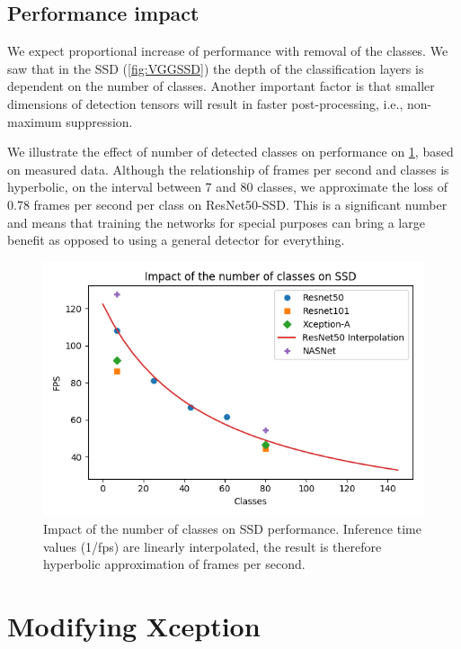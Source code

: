 \subsection{Performance impact}
We expect proportional increase of performance with removal of the classes. We saw that in the SSD (\cref{fig:VGGSSD}) the depth of the classification layers is dependent on the number of classes. Another important factor is that smaller dimensions of detection tensors will result in faster post-processing, i.e., non-maximum suppression. 

We illustrate the effect of number of detected classes on performance on \cref{fig:fpscls}, based on measured data. Although the relationship of frames per second and classes is hyperbolic, on the interval between 7 and 80 classes, we approximate the loss of 0.78 frames per second per class on ResNet50-SSD. This is a significant number and means that training the networks for special purposes can bring a large benefit as opposed to using a general detector for everything.

\begin{figure}
    \centering
    \includegraphics[width=\textwidth]{img/fps_class}
    \caption[Impact of the number of classes on SSD performance]{Impact of the number of classes on SSD performance. Inference time values (1/fps) are linearly interpolated, the result is therefore hyperbolic approximation of frames per second.}
    \label{fig:fpscls}
\end{figure}


\section{Modifying Xception}
\label{sec:fixxception}



